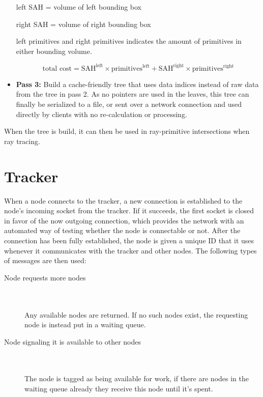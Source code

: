 \begin{itemize}
  left SAH = volume of left bounding box

  right SAH = volume of right bounding box

  left primitives and right primitives indicates the amount of primitives in either bounding volume.

  \begin{equation}
  	\text{total cost} = \text{SAH}^{\text{left}} \times \text{primitives}^{\text{left}} + \text{SAH}^{\text{right}} \times \text{primitives}^{\text{right}}
  \end{equation}

  \item \textbf{Pass 3:} Build a cache-friendly tree that uses data indices instead of raw data from the tree in pass 2. As no pointers are used in the leaves, this tree can finally be serialized to a file, or sent over a network connection and used directly by clients with no re-calculation or processing.
\end{itemize}

When the tree is build, it can then be used in ray-primitive intersections when ray tracing.

\section{Tracker}
When a node connects to the tracker, a new connection is established to the node's incoming socket from the tracker. Iif it succeeds, the first socket is closed in favor of the now outgoing connection, which provides the network with an automated way of testing whether the node is connectable or not. After the connection has been fully established, the node is given a unique ID that it uses whenever it communicates with the tracker and other nodes.
The following types of messages are then used:

\begin{description}
\item[Node requests more nodes] \hfill \\\\
Any available nodes are returned. If no such nodes exist, the requesting node is instead put in a waiting queue.
\item[Node signaling it is available to other nodes] \hfill \\\\
The node is tagged as being available for work, if there are nodes in the waiting queue already they receive this node until it's spent.
\end{description}

